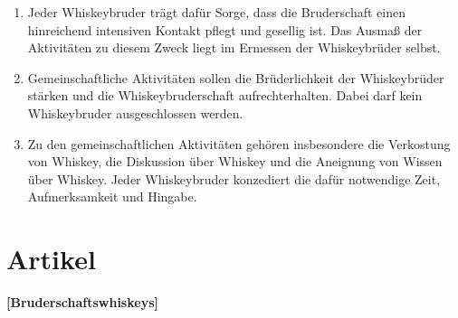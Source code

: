 \documentclass[a4paper,12pt]{scrartcl}
\begin{document}
\begin{enumerate}

\item Jeder Whiskeybruder trägt dafür Sorge, dass die Bruderschaft einen hinreichend intensiven
  Kontakt pflegt und gesellig ist. Das Ausmaß der Aktivitäten zu diesem Zweck liegt im Ermessen der
  Whiskeybrüder selbst.

\item Gemeinschaftliche Aktivitäten sollen die Brüderlichkeit der Whiskeybrüder stärken und die
  Whiskeybruderschaft aufrechterhalten. Dabei darf kein Whiskeybruder ausgeschlossen werden.

\item Zu den gemeinschaftlichen Aktivitäten gehören insbesondere die Verkostung von Whiskey, die
  Diskussion über Whiskey und die Aneignung von Wissen über Whiskey. Jeder Whiskeybruder konzediert
  die dafür notwendige Zeit, Aufmerksamkeit und Hingabe.

\end{enumerate}



\section{Artikel \thesection}
\label{sec:bruderschaftswhiskeys}
\textbf{[Bruderschaftswhiskeys]}
\end{document}
